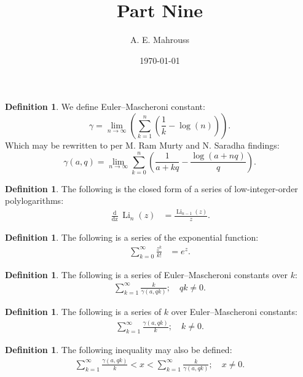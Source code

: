 \documentclass[10pt]{article}
\title{%
	\vspace{-1.5em}%
	\large\textbf{Part Nine}%
}
\author{A. E. Mahrouss}
\date{\today}
\theoremstyle{plain}
\theoremstyle{definition}
\newtheorem{definition}[theorem]{Definition}
\theoremstyle{remark}
\begin{document}
	
	\begin{definition}
		We define Euler–Mascheroni constant:
		\begin{equation}
			\gamma = \lim_{n \to \infty}(\sum_{k=1}^{n}(\frac{1}{k}-\log(n))).
		\end{equation}
		Which may be rewritten to per M. Ram Murty and N. Saradha findings:
		\begin{equation}
			\gamma(a, q) = \lim_{n \to \infty}\sum_{k=0}^{n}(\frac{1}{a+kq}-\frac{\log(a+nq)}{q}).
		\end{equation}
	\end{definition}
	
	\begin{definition}
		The following is the closed form of a series of low-integer-order polylogarithms:
		\begin{align*}
			\frac{\operatorname{d}}{\operatorname{dz}} \operatorname{Li}_{n}(z) &= \frac{\operatorname{Li}_{n-1}(z)}{z}.
		\end{align*}
	\end{definition}
	
	\begin{definition}
		The following is a series of the exponential function:
		\begin{align*}
			\sum_{k=0}^{\infty} \frac{z^k}{k!} &= e^{z}.
		\end{align*}
	\end{definition}
	
	\begin{definition}
		The following is a series of Euler–Mascheroni constants over $k$:
		\begin{align*}
			\sum_{k=1}^{\infty} \frac{k}{\gamma(a, qk)}; \quad qk \neq 0.
		\end{align*}
	\end{definition}
	
	\begin{definition}
		The following is a series of $k$ over Euler–Mascheroni constants:
		\begin{align*}
			\sum_{k=1}^{\infty} \frac{\gamma(a, qk)}{k}; \quad k \neq 0.
		\end{align*}
	\end{definition}
	
	\begin{definition}
		The following inequality may also be defined:
		\begin{align*}
			\sum_{k=1}^{\infty} \frac{\gamma(a, qk)}{k} < x < \sum_{k=1}^{\infty} \frac{k}{\gamma(a, qk)}; \quad x \neq 0.
		\end{align*}
	\end{definition}
	
\end{document}
